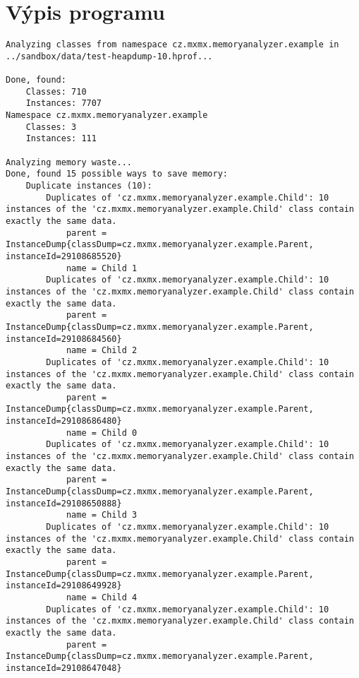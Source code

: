 \section{Výpis programu}
\label{runtime-log}
\begin{minipage}{\linewidth}
\begin{lstlisting}[basicstyle=\tiny,columns=fullflexible,frame=single,breaklines=true,postbreak=\mbox{\textcolor{red}{$\hookrightarrow$}\space}]
Analyzing classes from namespace cz.mxmx.memoryanalyzer.example in ../sandbox/data/test-heapdump-10.hprof...

Done, found:
    Classes: 710
    Instances: 7707
Namespace cz.mxmx.memoryanalyzer.example
    Classes: 3
    Instances: 111

Analyzing memory waste...
Done, found 15 possible ways to save memory:
    Duplicate instances (10):
        Duplicates of 'cz.mxmx.memoryanalyzer.example.Child': 10 instances of the 'cz.mxmx.memoryanalyzer.example.Child' class contain exactly the same data.
            parent = InstanceDump{classDump=cz.mxmx.memoryanalyzer.example.Parent, instanceId=29108685520}
            name = Child 1
        Duplicates of 'cz.mxmx.memoryanalyzer.example.Child': 10 instances of the 'cz.mxmx.memoryanalyzer.example.Child' class contain exactly the same data.
            parent = InstanceDump{classDump=cz.mxmx.memoryanalyzer.example.Parent, instanceId=29108684560}
            name = Child 2
        Duplicates of 'cz.mxmx.memoryanalyzer.example.Child': 10 instances of the 'cz.mxmx.memoryanalyzer.example.Child' class contain exactly the same data.
            parent = InstanceDump{classDump=cz.mxmx.memoryanalyzer.example.Parent, instanceId=29108686480}
            name = Child 0
        Duplicates of 'cz.mxmx.memoryanalyzer.example.Child': 10 instances of the 'cz.mxmx.memoryanalyzer.example.Child' class contain exactly the same data.
            parent = InstanceDump{classDump=cz.mxmx.memoryanalyzer.example.Parent, instanceId=29108650888}
            name = Child 3
        Duplicates of 'cz.mxmx.memoryanalyzer.example.Child': 10 instances of the 'cz.mxmx.memoryanalyzer.example.Child' class contain exactly the same data.
            parent = InstanceDump{classDump=cz.mxmx.memoryanalyzer.example.Parent, instanceId=29108649928}
            name = Child 4
        Duplicates of 'cz.mxmx.memoryanalyzer.example.Child': 10 instances of the 'cz.mxmx.memoryanalyzer.example.Child' class contain exactly the same data.
            parent = InstanceDump{classDump=cz.mxmx.memoryanalyzer.example.Parent, instanceId=29108647048}

\end{lstlisting}
\end{minipage}
